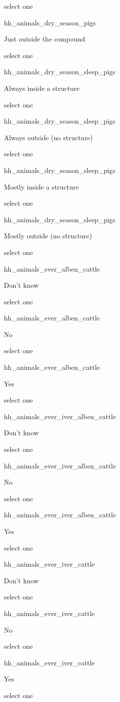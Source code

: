 \documentclass[]{article}
\begin{document}
select one

hh\_animals\_dry\_season\_pigs

Just outside the compound

select one

hh\_animals\_dry\_season\_sleep\_pigs

Always inside a structure

select one

hh\_animals\_dry\_season\_sleep\_pigs

Always outside (no structure)

select one

hh\_animals\_dry\_season\_sleep\_pigs

Mostly inside a structure

select one

hh\_animals\_dry\_season\_sleep\_pigs

Mostly outside (no structure)

select one

hh\_animals\_ever\_alben\_cattle

Don't know

select one

hh\_animals\_ever\_alben\_cattle

No

select one

hh\_animals\_ever\_alben\_cattle

Yes

select one

hh\_animals\_ever\_iver\_alben\_cattle

Don't know

select one

hh\_animals\_ever\_iver\_alben\_cattle

No

select one

hh\_animals\_ever\_iver\_alben\_cattle

Yes

select one

hh\_animals\_ever\_iver\_cattle

Don't know

select one

hh\_animals\_ever\_iver\_cattle

No

select one

hh\_animals\_ever\_iver\_cattle

Yes

select one
\end{document}
